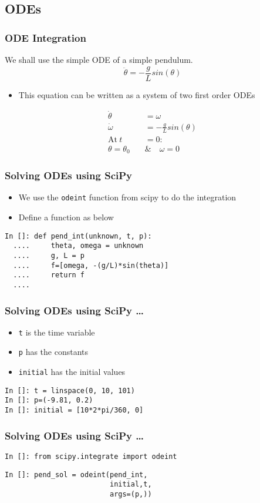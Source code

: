 \documentclass[14pt,compress]{beamer}
\newcounter{time}
\newcommand{\typ}[1]{\lstinline{#1}}
\begin{document}
\subsection{ODEs}

\begin{frame}[fragile]
\frametitle{ODE Integration}
We shall use the simple ODE of a simple pendulum. 
\begin{equation*}
\ddot{\theta} = -\frac{g}{L}sin(\theta)
\end{equation*}
\begin{itemize}
\item This equation can be written as a system of two first order ODEs
\end{itemize}
\begin{align}
\dot{\theta} &= \omega \\
\dot{\omega} &= -\frac{g}{L}sin(\theta) \\
 \text{At}\ t &= 0 : \nonumber \\
 \theta = \theta_0\quad & \&\quad  \omega = 0 \nonumber
\end{align}
\end{frame}

\begin{frame}[fragile]
\frametitle{Solving ODEs using SciPy}
\begin{itemize}
\item We use the \typ{odeint} function from scipy to do the integration
\item Define a function as below
\end{itemize}
\begin{lstlisting}
In []: def pend_int(unknown, t, p):
  ....     theta, omega = unknown
  ....     g, L = p
  ....     f=[omega, -(g/L)*sin(theta)]
  ....     return f
  ....
\end{lstlisting}
\end{frame}

\begin{frame}[fragile]
\frametitle{Solving ODEs using SciPy \ldots}
\begin{itemize}
\item \typ{t} is the time variable \\ 
\item \typ{p} has the constants \\
\item \typ{initial} has the initial values
\end{itemize}
\begin{lstlisting}
In []: t = linspace(0, 10, 101)
In []: p=(-9.81, 0.2)
In []: initial = [10*2*pi/360, 0]
\end{lstlisting}
\end{frame}

\begin{frame}[fragile]
\frametitle{Solving ODEs using SciPy \ldots}

\small{\typ{In []: from scipy.integrate import odeint}}
\begin{lstlisting}
In []: pend_sol = odeint(pend_int, 
                         initial,t, 
                         args=(p,))
\end{lstlisting}
\end{frame}
\end{document}
